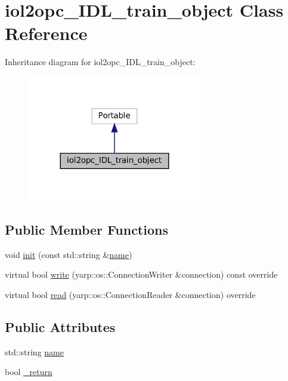 \hypertarget{classiol2opc__IDL__train__object}{}\section{iol2opc\+\_\+\+I\+D\+L\+\_\+train\+\_\+object Class Reference}
\label{classiol2opc__IDL__train__object}


Inheritance diagram for iol2opc\+\_\+\+I\+D\+L\+\_\+train\+\_\+object\+:
\nopagebreak
\begin{figure}[H]
\begin{center}
\leavevmode
\includegraphics[width=216pt]{classiol2opc__IDL__train__object__inherit__graph}
\end{center}
\end{figure}
\subsection*{Public Member Functions}
\begin{DoxyCompactItemize}
\item 
void \hyperlink{classiol2opc__IDL__train__object_a5ff9c578a2582001547215f6ce52900c}{init} (const std\+::string \&\hyperlink{classiol2opc__IDL__train__object_aab50ba72f74d1394c5dd39fec01e97a0}{name})
\item 
virtual bool \hyperlink{classiol2opc__IDL__train__object_aae32b8cece17251006f15b49c61a6dd9}{write} (yarp\+::os\+::\+Connection\+Writer \&connection) const override
\item 
virtual bool \hyperlink{classiol2opc__IDL__train__object_aed2ae49db44b0549276f97c6806fea0c}{read} (yarp\+::os\+::\+Connection\+Reader \&connection) override
\end{DoxyCompactItemize}
\subsection*{Public Attributes}
\begin{DoxyCompactItemize}
\item 
std\+::string \hyperlink{classiol2opc__IDL__train__object_aab50ba72f74d1394c5dd39fec01e97a0}{name}
\item 
bool \hyperlink{classiol2opc__IDL__train__object_a859856bbde79547c0da417c9a00b18df}{\+\_\+return}
\end{DoxyCompactItemize}


